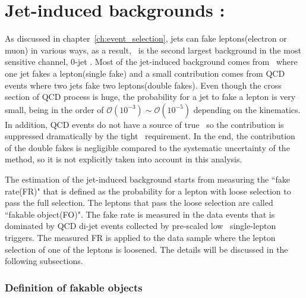 \section{ Jet-induced backgrounds : \Wjets} 
\label{sec:wjets}

As discussed in chapter~\ref{ch:event_selection}, 
jets can fake leptons(electron or muon) in various ways, 
as a result, \Wjets\ is the second largest background in the most 
sensitive channel, 0-jet \DF. 
Most of the jet-induced background comes from \Wjets\ where one jet fakes a lepton(single fake)
and a small contribution comes from QCD events where two jets fake two leptons(double fakes).  
Even though the cross section of QCD process is huge, the probability for a jet 
to fake a lepton is very small, being in the order of 
$\mathcal{O}(10^{-3}) \sim \mathcal{O}(10^{-5})$
depending on the kinematics. In addition, QCD events do not have a source of true \met\, 
so the contribution is suppressed dramatically by the tight \met\ requirement. 
In the end, the contribution of the double fakes is negligible compared to the 
systematic uncertainty of the method, so it is not explicitly taken into account in this analysis. 

The estimation of the jet-induced background starts from measuring the ``fake rate(FR)"
that is defined as the probability for a lepton with loose selection to pass the full selection. 
The leptons that pass the loose selection are called ``fakable object(FO)". The fake rate is 
measured in the data events that is dominated by QCD di-jet events collected 
by pre-scaled low \pt\ single-lepton triggers. 
The measured FR is applied to the data sample where the lepton selection 
of one of the leptons is loosened. 
The details will be discussed in the following subsections.

\subsubsection{Definition of fakable objects}


